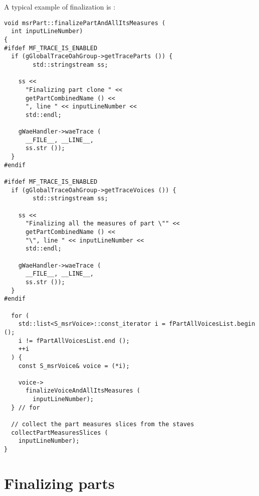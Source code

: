 A typical example of \cascading finalization is :
\begin{lstlisting}[language=CPlusPlus]
void msrPart::finalizePartAndAllItsMeasures (
  int inputLineNumber)
{
#ifdef MF_TRACE_IS_ENABLED
  if (gGlobalTraceOahGroup->getTraceParts ()) {
		std::stringstream ss;

    ss <<
      "Finalizing part clone " <<
      getPartCombinedName () <<
      ", line " << inputLineNumber <<
      std::endl;

    gWaeHandler->waeTrace (
      __FILE__, __LINE__,
      ss.str ());
  }
#endif

#ifdef MF_TRACE_IS_ENABLED
  if (gGlobalTraceOahGroup->getTraceVoices ()) {
		std::stringstream ss;

    ss <<
      "Finalizing all the measures of part \"" <<
      getPartCombinedName () <<
      "\", line " << inputLineNumber <<
      std::endl;

    gWaeHandler->waeTrace (
      __FILE__, __LINE__,
      ss.str ());
  }
#endif

  for (
    std::list<S_msrVoice>::const_iterator i = fPartAllVoicesList.begin ();
    i != fPartAllVoicesList.end ();
    ++i
  ) {
    const S_msrVoice& voice = (*i);

    voice->
      finalizeVoiceAndAllItsMeasures (
        inputLineNumber);
  } // for

  // collect the part measures slices from the staves
  collectPartMeasuresSlices (
    inputLineNumber);
}
\end{lstlisting}


\section{Finalizing parts}

